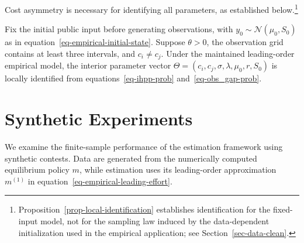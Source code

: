 \documentclass[mnsc]{informs3}
\begin{document}
Cost asymmetry is necessary for identifying all parameters, as established below.\footnote{Proposition~\ref{prop-local-identification} establishes identification for the fixed-input model, not for the sampling law induced by the data-dependent initialization used in the empirical application; see Section~\ref{sec-data-clean}.}

\begin{proposition}\label{prop-local-identification}
{Fix the initial public input before generating observations, with $y_0\sim\mathcal N(\mu_0,S_0)$ as in equation~\eqref{eq-empirical-initial-state}. Suppose $\theta>0$, the observation grid contains at least three intervals, and $c_i\ne c_j$. Under the maintained leading-order empirical model, the interior parameter vector $\Theta=(c_i,c_j,\sigma,\lambda,\mu_0,r,S_0)$ is locally identified from equations~\eqref{eq-ihpp-prob} and~\eqref{eq-obs_gap-prob}.}
\end{proposition}


\section{Synthetic Experiments}\label{sect-synthetic}

{We examine the finite-sample performance of the estimation framework using synthetic contests. Data are generated from the numerically computed equilibrium policy $m$, while estimation uses its leading-order approximation $m^{(1)}$ in equation~\eqref{eq-empirical-leading-effort}.}
\end{document}
